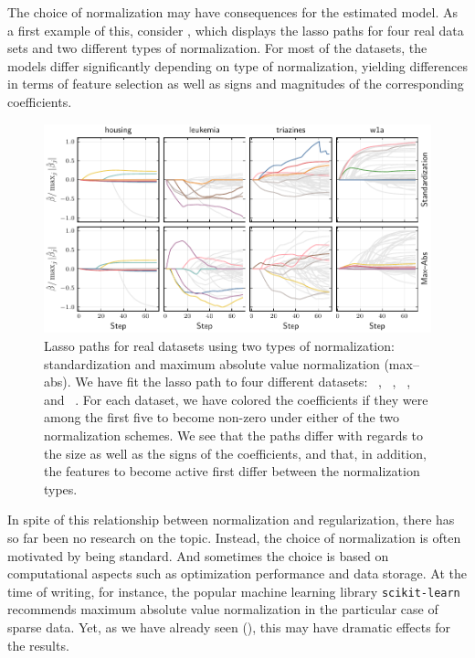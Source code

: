 The choice of normalization may have consequences for the estimated model. As a first
example of this, consider , which displays the lasso paths for
four real data sets and two different types of normalization. For most of the datasets, the
models differ significantly depending on type of normalization, yielding differences in
terms of feature selection as well as signs and magnitudes of the corresponding
coefficients.

\begin{figure}[bpt]
  \centering
  \includegraphics[]{plots/realdata_paths.pdf}
  \caption{%
    Lasso paths for real datasets using two types of normalization:
    standardization and maximum absolute value normalization (max--abs). We have fit
    the lasso path to four different datasets:
    ~\citep{harrison1978}, ~\citep{golub1999},
    ~\citep{king}, and ~\citep{platt1998}. For each
    dataset, we have colored the coefficients if they were among the first five
    to become non-zero under either of the two normalization schemes. We see
    that the paths differ with regards to the size as well as the signs of the
    coefficients, and that, in addition, the features to become active first
    differ between the normalization types.
  }
  \label{fig:realdata-paths}
\end{figure}

In spite of this relationship between normalization and regularization, there has so far
been no research on the topic. Instead, the choice of normalization is often motivated by
being standard. And sometimes the choice is based on computational aspects such as
optimization performance and data storage. At the time of writing, for instance, the
popular machine learning library \texttt{scikit-learn}~\citep{scikit-learndevelopers2024}
recommends maximum absolute value normalization in the particular case of sparse data. Yet,
as we have already seen (), this may have dramatic effects for the
results.

